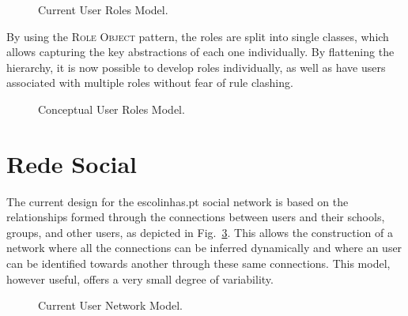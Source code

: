 \documentclass[9pt,a4paper]{extarticle}
\begin{document}
\begin{multicols}{2}
\begin{figure}[H]
  \caption{Current User Roles Model.}
  \label{fig:user_roles_current}
\end{figure}

By using the \textsc{Role Object} pattern, the roles are split into single classes, which allows capturing the key abstractions of each one individually. By flattening the hierarchy, it is now possible to develop roles individually, as well as have users associated with multiple roles without fear of rule clashing.

\begin{figure}[H]
  \caption{Conceptual User Roles Model.}
  \label{fig:user_roles_conceptual}
\end{figure}

\section{Rede Social}\label{sec:social_network}

The current design for the escolinhas.pt social network is based on the relationships formed through the connections between users and their schools, groups, and other users, as depicted in Fig.~\ref{fig:social_network_current}. This allows the construction of a network where all the connections can be inferred dynamically and where an user can be identified towards another through these same connections. This model, however useful, offers a very small degree of variability.

\begin{figure}[H]
  \caption{Current User Network Model.}
  \label{fig:social_network_current}
\end{figure}


\end{multicols}
\end{document}
